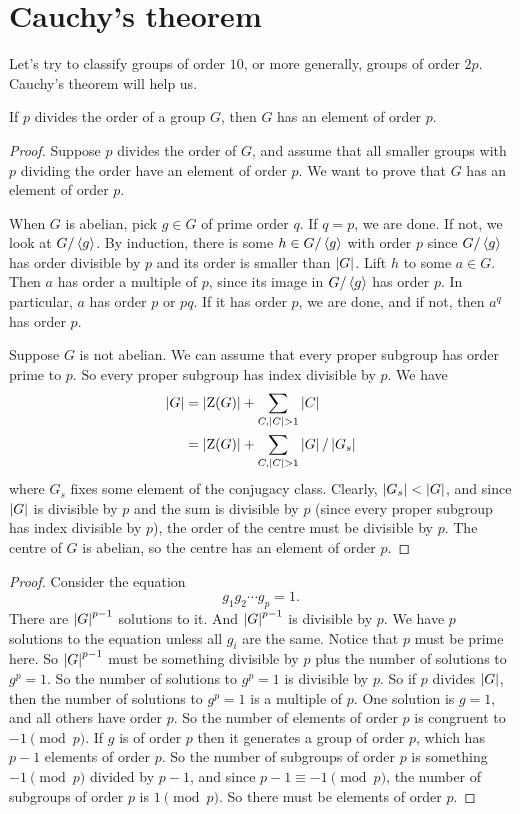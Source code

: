 \documentclass[11pt, oneside]{amsart}
\begin{document}
\section{Cauchy's theorem}
Let's try to classify groups of order $10$, or more generally, groups of order $2p$. Cauchy's theorem will help us.
\begin{theorem}[Cauchy]\label{cauchy}
If $p$ divides the order of a group $G$, then $G$ has an element of order $p$.
\end{theorem}
\begin{proof}
Suppose $p$ divides the order of $G$, and assume that all smaller groups with $p$ dividing the order have an element of order $p$. We want to prove that $G$ has an element of order $p$.

When $G$ is abelian, pick $g\in G$ of prime order $q$. If $q=p$, we are done. If not, we look at $G/\left \langle g \right \rangle$. By induction, there is some $h\in G/\left \langle g \right \rangle$ with order $p$ since $G/\left \langle g \right \rangle$ has order divisible by $p$ and its order is smaller than $\left \lvert G \right \rvert$. Lift $h$ to some $a\in G$. Then $a$ has order a multiple of $p$, since its image in $G/\left \langle g \right \rangle$ has order $p$. In particular, $a$ has order $p$ or $pq$. If it has order $p$, we are done, and if not, then $a^q$ has order $p$.

Suppose $G$ is not abelian. We can assume that every proper subgroup has order prime to $p$. So every proper subgroup has index divisible by $p$. We have
\begin{align*}
\left \lvert G \right \rvert &= \left \lvert \operatorname{Z}(G) \right \rvert + \sum_{C,\left \lvert C \right \rvert > 1}\left \lvert C \right \rvert\\
&= \left \lvert \operatorname{Z}(G) \right \rvert + \sum_{C,\left \lvert C \right \rvert > 1} \left \lvert G \right \rvert/\left \lvert G_s \right \rvert
\end{align*}
where $G_s$ fixes some element of the conjugacy class. Clearly, $\left \lvert G_s \right \rvert < \left \lvert G \right \rvert$, and since $\left \lvert G \right \rvert $ is divisible by $p$ and the sum is divisible by $p$ (since every proper subgroup has index divisible by $p$), the order of the centre must be divisible by $p$. The centre of $G$ is abelian, so the centre has an element of order $p$.
\end{proof}

\begin{proof}
Consider the equation
$$
g_1g_2\cdots g_p = 1.
$$
There are $\left \lvert G \right \rvert ^{p-1}$ solutions to it. And $\left \lvert G \right \rvert^{p-1}$ is divisible by $p$. We have $p$ solutions to the equation unless all $g_i$ are the same. Notice that $p$ must be prime here. So $\left \lvert G \right \rvert^{p-1}$ must be something divisible by $p$ plus the number of solutions to $g^p=1$. So the number of solutions to $g^p=1$ is divisible by $p$. So if $p$ divides $\left \lvert G \right \rvert$, then the number of solutions to $g^p=1$ is a multiple of $p$. One solution is $g=1$, and all others have order $p$. So the number of elements of order $p$ is congruent to $-1\pmod p$. If $g$ is of order $p$ then it generates a group of order $p$, which has $p-1$ elements of order $p$. So the number of subgroups of order $p$ is something $-1\pmod p$ divided by $p-1$, and since $p-1\equiv -1\pmod p$, the number of subgroups of order $p$ is $1\pmod p$. So there must be elements of order $p$.
\end{proof}
\end{document}
